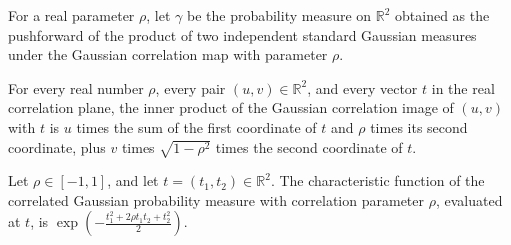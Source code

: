 \begin{definition}
\label{FABL.correlatedGaussianMeasure}
\leanok
{}
For a real parameter $\rho$, let $\gamma$ be the probability measure on $\mathbb R^2$
obtained as the pushforward of the product of two independent standard Gaussian measures
under the Gaussian correlation map with parameter $\rho$.
\end{definition}

\begin{theorem}
\label{FABL.inner_gaussianCorrelationMap}
\leanok
{}
For every real number $\rho$, every pair $(u,v)\in\mathbb{R}^2$, and every vector $t$ in
the real correlation plane, the inner product of the Gaussian correlation image of
$(u,v)$ with $t$ is $u$ times the sum of the first coordinate of $t$ and $\rho$ times
its second coordinate, plus $v$ times $\sqrt{1-\rho^2}$ times the second coordinate of
$t$.
\end{theorem}

\begin{theorem}
\label{FABL.charFun_correlatedGaussianMeasure}
\leanok
{}
Let $\rho\in[-1,1]$, and let $t=(t_1,t_2)\in\mathbb R^2$. The characteristic function of
the correlated Gaussian probability measure with correlation parameter $\rho$, evaluated
at $t$, is $\displaystyle \exp\!\left(-\frac{t_1^2+2\rho t_1t_2+t_2^2}{2}\right)$.
\end{theorem}

